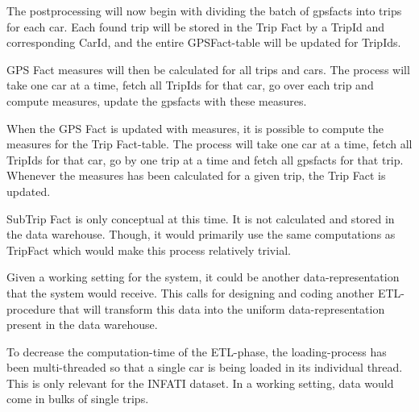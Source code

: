 The postprocessing will now begin with dividing the batch of gpsfacts into trips for each car. Each found trip will be stored in the Trip Fact by a TripId and corresponding CarId, and the entire GPSFact-table will be updated for TripIds. 

GPS Fact measures will then be calculated for all trips and cars. The process will take one car at a time, fetch all TripIds for that car, go over each trip and compute measures, update the gpsfacts with these measures.

When the GPS Fact is updated with measures, it is possible to compute the measures for the Trip Fact-table. The process will take one car at a time, fetch all TripIds for that car, go by one trip at a time and fetch all gpsfacts for that trip. Whenever the measures has been calculated for a given trip, the Trip Fact is updated.

SubTrip Fact is only conceptual at this time. It is not calculated and stored in the data warehouse. Though, it would primarily use the same computations as TripFact which would make this process relatively trivial.

Given a working setting for the system, it could be another data-representation that the system would receive. This calls for designing and coding another ETL-procedure that will transform this data into the uniform data-representation present in the data warehouse.

To decrease the computation-time of the ETL-phase, the loading-process has been multi-threaded so that a single car is being loaded in its individual thread. This is only relevant for the INFATI dataset. In a working setting, data would come in bulks of single trips. 